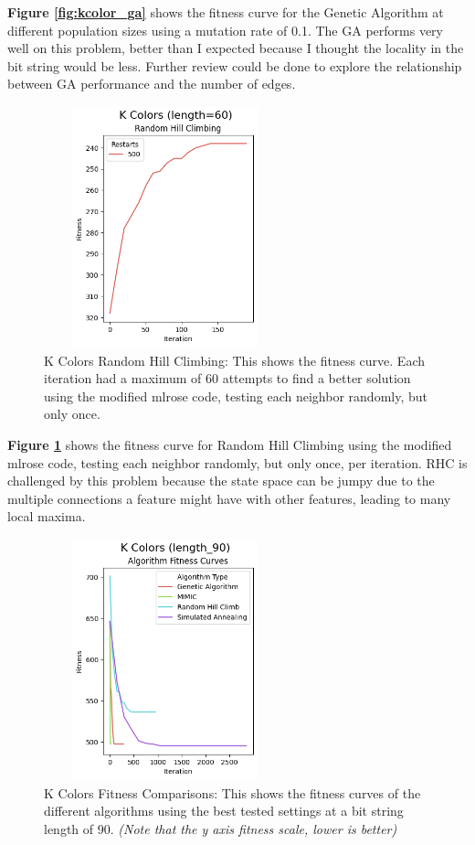 \documentclass[letterpaper]{article} %
\begin{document}
\textbf{Figure \ref{fig:kcolor_ga}} shows the fitness curve for the Genetic Algorithm at different population sizes using a mutation rate of 0.1.   The GA performs very well on this problem, better than I expected because I thought the locality in the bit string would be less.  Further review could be done to explore the relationship between GA performance and the number of edges.  

\begin{figure}[!htb]
\centering
\includegraphics[width=2.75in, height=2.75in]{figures/K_Colors_length=60_Random_Hill_Climbing_l_60_ma_60_r_500_.png}
\caption{K Colors Random Hill Climbing: This shows the fitness curve. Each iteration had a maximum of 60 attempts to find a better solution using the modified mlrose code, testing each neighbor randomly, but only once. }
\label{fig:kcolor_rhc}
\end{figure}

\textbf{Figure \ref{fig:kcolor_rhc}} shows the fitness curve for Random Hill Climbing using the modified mlrose code, testing each neighbor randomly, but only once, per iteration.  RHC is challenged by this problem because the state space can be jumpy due to the multiple connections a feature might have with other features, leading to many local maxima.  


\begin{figure}[!htb]
\centering
\includegraphics[width=2.75in, height=2.75in]{figures/K_Colors_length_90_Algorithm_Fitness_Curves_.png}
\caption{K Colors Fitness Comparisons: This shows the fitness curves of the different algorithms using the best tested settings at a bit string length of 90. \emph{(Note that the y axis fitness scale, lower is better)} }
\label{fig:kcolor_fitness_comparison_90}
\end{figure}
\end{document}
